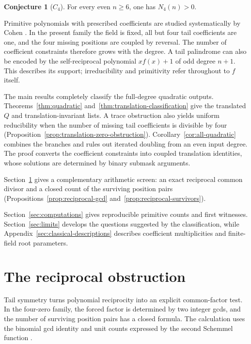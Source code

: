 \documentclass[11pt]{article}
\theoremstyle{definition}
\newtheorem{conjecture}[proposition]{Conjecture}
\theoremstyle{remark}
\begin{document}
\begin{conjecture}[$C_4$]\label{conj:C4}
For every even $n\ge6$, one has $N_4(n)>0$.
\end{conjecture}

Primitive polynomials with prescribed coefficients are studied systematically
by Cohen \cite{Coh06}. In the present family the field is fixed, all but four
tail coefficients are one, and the four missing positions are coupled by
reversal. The number of coefficient constraints therefore grows with the
degree. A tail palindrome can also be encoded by the self-reciprocal
polynomial $xf(x)+1$ of odd degree $n+1$. This describes its support;
irreducibility and primitivity refer throughout to $f$ itself.

The main results completely classify the full-degree quadratic outputs.
Theorems~\ref{thm:quadratic} and~\ref{thm:translation-classification}
give the translated $Q$ and translation-invariant lists. A trace obstruction
also yields uniform reducibility when the number of missing tail
coefficients is divisible by four
(Proposition~\ref{prop:translation-zero-obstruction}).
Corollary~\ref{cor:all-quadratic} combines the branches and rules out
iterated doubling from an even input degree. The proof converts the
coefficient constraints into coupled translation identities, whose solutions
are determined by binary submask arguments.

Section~\ref{sec:reciprocal-screen} gives a complementary arithmetic
screen: an exact reciprocal common divisor and a closed count of the
surviving position pairs (Propositions~\ref{prop:reciprocal-gcd}
and~\ref{prop:reciprocal-survivors}).

Section~\ref{sec:computations} gives reproducible primitive counts and
first witnesses. Section~\ref{sec:limits} develops the questions suggested
by the classification, while Appendix~\ref{sec:classical-descriptions}
describes coefficient multiplicities and finite-field root parameters.

\section{The reciprocal obstruction}
\label{sec:reciprocal-screen}

Tail symmetry turns polynomial reciprocity into an explicit common-factor
test. In the four-zero family, the forced factor is determined by two
integer gcds, and the number of surviving position pairs has a closed
formula. The calculation uses the binomial gcd identity \cite{LN} and
unit counts expressed by the second Schemmel function \cite[Section~1]{Def20}.
\end{document}
